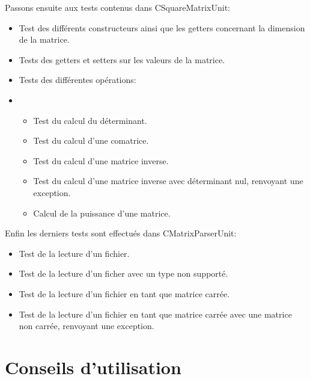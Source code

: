 		Passons ensuite aux tests contenus dans CSquareMatrixUnit:
		\begin{itemize}
			\item Test des différents constructeurs ainsi que les getters concernant la dimension de la matrice.
			\item Tests des getters et setters sur les valeurs de la matrice.
			\item Tests des différentes opérations:
			\item 
			\begin{itemize}
				\item Test du calcul du déterminant.
				\item Test du calcul d'une comatrice.
				\item Test du calcul d'une matrice inverse.
				\item Test du calcul d'une matrice inverse avec déterminant nul, renvoyant une exception.
				\item Calcul de la puissance d'une matrice.
			\end{itemize}
		\end{itemize}
		
		Enfin les derniers tests sont effectués dans CMatrixParserUnit:
		\begin{itemize}
			\item Test de la lecture d'un fichier.
			\item Test de la lecture d'un ficher avec un type non supporté.
			\item Test de la lecture d'un fichier en tant que matrice carrée.
			\item Test de la lecture d'un fichier en tant que matrice carrée avec une matrice non carrée, renvoyant une exception.
		\end{itemize}
	
	\chapter{Conseils d'utilisation}


